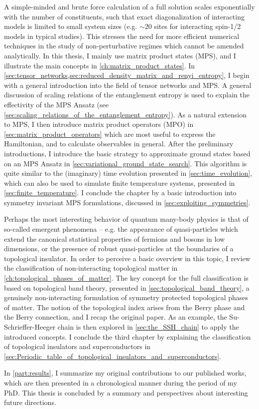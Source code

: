 A simple-minded and brute force calculation of a full solution scales exponentially with the number of constituents, such that exact diagonalization of interacting models is limited to small system sizes (e.g. $\sim 20$ sites for interacting spin-1/2 models in typical studies).
This stresses the need for more efficient numerical techniques in the study of non-perturbative regimes which cannot be amended analytically.
In this thesis, I mainly use matrix product states (MPS), and I illustrate the main concepts in \cref{ch:matrix_product_states}.
In \cref{sec:tensor_networks,sec:reduced_density_matrix_and_renyi_entropy}, I begin with a general introduction into the field of tensor networks and MPS.
A general discussion of scaling relations of the entanglement entropy is used to explain the effectivity of the MPS Ansatz (see \cref{sec:scaling_relations_of_the_entanglement_entropy}).
As a natural extension to MPS, I then introduce matrix product operators (MPO) in \cref{sec:matrix_product_operators} which are most useful to express the Hamiltonian, and to calculate observables in general.
After the preliminary introductions, I introduce the basic strategy to approximate ground states based on an MPS Ansatz in \cref{sec:variational_ground_state_search}.
This algorithm is quite similar to the (imaginary) time evolution presented in \cref{sec:time_evolution}, which can also be used to simulate finite temperature systems, presented in \cref{sec:finite_temperature}.
I conclude the chapter by a basic introduction into symmetry invariant MPS formulations, discussed in \cref{sec:exploiting_symmetries}.

Perhaps the most interesting behavior of quantum many-body physics is that of so-called emergent phenomena -- e.g. the appearance of quasi-particles which extend the canonical statistical properties of fermions and bosons in low dimensions, or the presence of robust quasi-particles at the boundaries of a topological insulator.
In order to perceive a basic overview in this topic, I review the classification of non-interacting topological matter in \cref{ch:topological_phases_of_matter}.
The key concept for the full classification is based on topological band theory, presented in \cref{sec:topological_band_theory}, a genuinely non-interacting formulation of symmetry protected topological phases of matter.
The notion of the topological index arises from the Berry phase and the Berry connection, and I recap the original paper.
As an example, the Su-Schrieffer-Heeger chain is then explored in \cref{sec:the_SSH_chain} to apply the introduced concepts.
I conclude the third chapter by explaining the classification of topological insulators and superconductors in \cref{sec:Periodic_table_of_topological_insulators_and_superconductors}.

In \cref{part:results}, I summarize my original contributions to our published works, which are then presented in a chronological manner during the period of my PhD.
This thesis is concluded by a summary and perspectives about interesting future directions.
